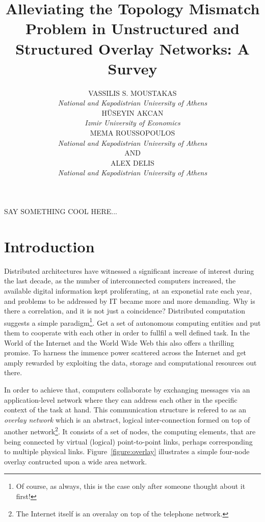 \documentclass[acmcsur,acmnow]{acmtrans2m}
\title{Alleviating the Topology Mismatch Problem in Unstructured and Structured Overlay Networks: A Survey}
\author{
VASSILIS S. MOUSTAKAS\\\emph{National and Kapodistrian University of Athens}\\
H\"USEYIN AKCAN\\\emph{Izmir University of Economics}\\
MEMA ROUSSOPOULOS\\\emph{National and Kapodistrian University of Athens}\\
AND\\
ALEX DELIS\\\emph{National and Kapodistrian University of Athens}\\
}
\begin{document}
\begin{bottomstuff}
SAY SOMETHING COOL HERE...
\end{bottomstuff}

\maketitle

\section{Introduction}

Distributed architectures have witnessed a significant increase of interest during the last decade, as the number of interconnected computers increased, the available digital information kept proliferating, at an exponetial rate each year, and problems to be addressed by IT became more and more demanding. Why is there a correlation, and it is not just a coincidence? Distributed computation suggests a simple paradigm\footnote{Of course, as always, this is the case only after someone thought about it first!}. Get a set of autonomous computing entities and put them to cooperate with each other in order to fullfil a well defined task. In the World of the Internet and the World Wide Web this also offers a thrilling promise. To harness the immence power scattered across the Internet and get amply rewarded by exploiting the data, storage and computational resources out there.

In order to achieve that, computers collaborate by exchanging messages via an application-level network where they can address each other in the specific context of the task at hand. This communication structure is refered to as an \emph{overlay network} which is an abstract, logical inter-connection formed on top of another network\footnote{The Internet itself is an overalay on top of the telephone network.}. It consists of a set of nodes, the computing elements, that are being connected by virtual (logical) point-to-point links, perhaps corresponding to multiple physical links. Figure~\ref{figure:overlay} illustrates a simple four-node overlay contructed upon a wide area network.
\end{document}
